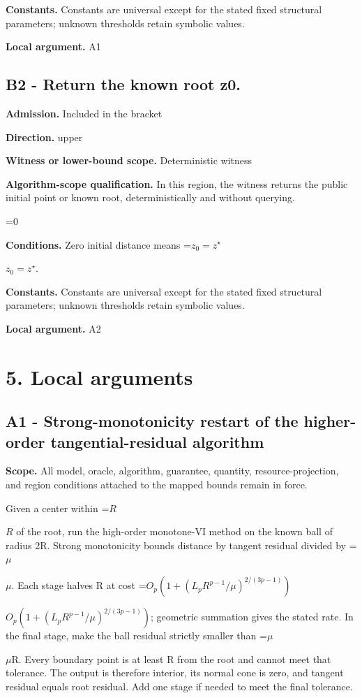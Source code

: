 \documentclass[10pt,a4paper]{article}
\newcommand{\AtlasMath}[1]{\par\begingroup\centering\setbox0=\hbox{$\displaystyle #1$}\ifdim\wd0>1.4\linewidth\typeout{ATLAS WIDE FORMULA: \the\wd0}\fi\ifdim\wd0>\linewidth\resizebox{\linewidth}{!}{\box0}\else\box0\fi\par\endgroup}
\newcommand{\AtlasInlineMath}[1]{\begingroup\setbox0=\hbox{$#1$}\ifdim\wd0>.4\linewidth\endgroup\AtlasMath{#1}\else\endgroup$#1$\fi}
\begin{document}
\textbf{Constants.} Constants are universal except for the stated fixed structural parameters; unknown thresholds retain symbolic values.

\textbf{Local argument.} A1

\subsection{B2 - Return the known root z0.}
\textbf{Admission.} Included in the bracket

\textbf{Direction.} upper

\textbf{Witness or lower-bound scope.} Deterministic witness

\textbf{Algorithm-scope qualification.} In this region, the witness returns the public initial point or known root, deterministically and without querying.

\AtlasMath{0}
\textbf{Conditions.} Zero initial distance means \AtlasInlineMath{z_0=z^\star}.

\textbf{Constants.} Constants are universal except for the stated fixed structural parameters; unknown thresholds retain symbolic values.

\textbf{Local argument.} A2

\section{5. Local arguments}
\subsection{A1 - Strong-monotonicity restart of the higher-order tangential-residual algorithm}
\textbf{Scope.} All model, oracle, algorithm, guarantee, quantity, resource-projection, and region conditions attached to the mapped bounds remain in force.

Given a center within \AtlasInlineMath{R} of the root, run the high-order monotone-VI method on the known ball of radius 2R. Strong monotonicity bounds distance by tangent residual divided by \AtlasInlineMath{\mu}. Each stage halves R at cost \AtlasInlineMath{O_p(1+(L_pR^{p-1}/\mu)^{2/(3p-1)})}; geometric summation gives the stated rate. In the final stage, make the ball residual strictly smaller than \AtlasInlineMath{\mu}R. Every boundary point is at least R from the root and cannot meet that tolerance. The output is therefore interior, its normal cone is zero, and tangent residual equals root residual. Add one stage if needed to meet the final tolerance.
\end{document}
